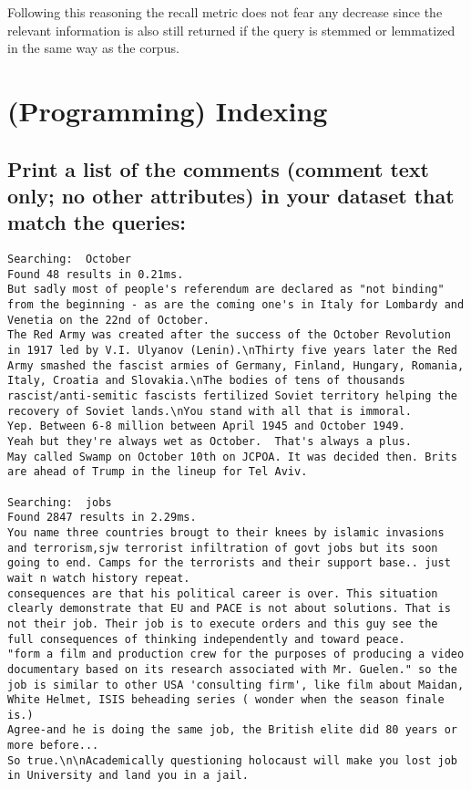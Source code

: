 \documentclass{scrartcl}
\begin{document}
Following this reasoning the recall metric does not fear any decrease since the relevant information is also still returned if the query is stemmed or lemmatized in the same way as the corpus.

\section{(Programming) Indexing}

\subsection{Print a list of the comments (comment text only; no other attributes) in your dataset that
match the queries: }

\begin{lstlisting}
Searching:  October
Found 48 results in 0.21ms.
But sadly most of people's referendum are declared as "not binding" from the beginning - as are the coming one's in Italy for Lombardy and Venetia on the 22nd of October.
The Red Army was created after the success of the October Revolution  in 1917 led by V.I. Ulyanov (Lenin).\nThirty five years later the Red Army smashed the fascist armies of Germany, Finland, Hungary, Romania, Italy, Croatia and Slovakia.\nThe bodies of tens of thousands rascist/anti-semitic fascists fertilized Soviet territory helping the recovery of Soviet lands.\nYou stand with all that is immoral.
Yep. Between 6-8 million between April 1945 and October 1949.
Yeah but they're always wet as October.  That's always a plus.
May called Swamp on October 10th on JCPOA. It was decided then. Brits are ahead of Trump in the lineup for Tel Aviv.

Searching:  jobs
Found 2847 results in 2.29ms.
You name three countries brougt to their knees by islamic invasions and terrorism,sjw terrorist infiltration of govt jobs but its soon going to end. Camps for the terrorists and their support base.. just wait n watch history repeat.
consequences are that his political career is over. This situation clearly demonstrate that EU and PACE is not about solutions. That is not their job. Their job is to execute orders and this guy see the full consequences of thinking independently and toward peace.
"form a film and production crew for the purposes of producing a video documentary based on its research associated with Mr. Guelen." so the job is similar to other USA 'consulting firm', like film about Maidan, White Helmet, ISIS beheading series ( wonder when the season finale is.)
Agree-and he is doing the same job, the British elite did 80 years or more before...
So true.\n\nAcademically questioning holocaust will make you lost job in University and land you in a jail.


\end{lstlisting}
\end{document}
